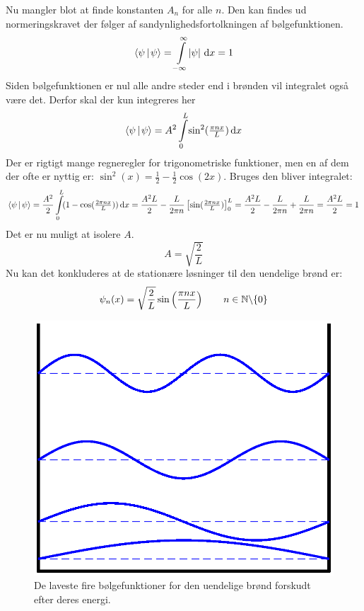 \documentclass[../Kvantemekanik.tex]{subfiles}
\begin{document}
Nu mangler blot at finde konstanten $A_n$ for alle $n$. Den kan findes ud normeringskravet der følger af sandynlighedsfortolkningen af bølgefunktionen.
$$
\braket{\psi}{\psi} = \integral{\abs{\psi}}{x}{-\infty}{\infty} = 1
$$ 
Siden bølgefunktionen er nul alle andre steder end i brønden vil integralet også være det. Derfor skal der kun integreres her
$$
\braket{\psi}{\psi} = A^2\integral{\sin^2(\tfrac{\pi n x}{L})}{x}{0}{L} 
$$
Der er rigtigt mange regneregler for trigonometriske funktioner, men en af dem der ofte er nyttig er: $\sin^2(x) =\frac{1}{2}-\frac{1}{2}\cos(2x)$. Bruges den bliver integralet:
$$
\braket{\psi}{\psi} = \frac{A^2}{2}\integral{(1-\cos(\tfrac{2\pi n x}{L}))}{x}{0}{L} = \frac{A^2L}{2}-\frac{L}{2\pi n}\left[\sin(\tfrac{2\pi nx}{L})\right]_0^L = \frac{A^2L}{2}-\frac{L}{2\pi n}+\frac{L}{2\pi n} = \frac{A^2L}{2} = 1
$$
Det er nu muligt at isolere $A$.
$$
A=\sqrt{\frac{2}{L}}
$$
Nu kan det konkluderes at de stationære løsninger til den uendelige brønd er:
\begin{equation}
\psi_n(x) = \sqrt{\frac{2}{L}}\sin\left(\frac{\pi nx}{L}\right)~~~~~~n\in \mathbb{N}\backslash\{0\}
\end{equation}
\begin{figure}
\center
\includegraphics[width = 0.75 \textwidth]{Kvantemekanik/billeder/infwellwave.eps}
\caption{De laveste fire bølgefunktioner for den uendelige brønd forskudt efter deres energi.}
\end{figure}
\end{document}
